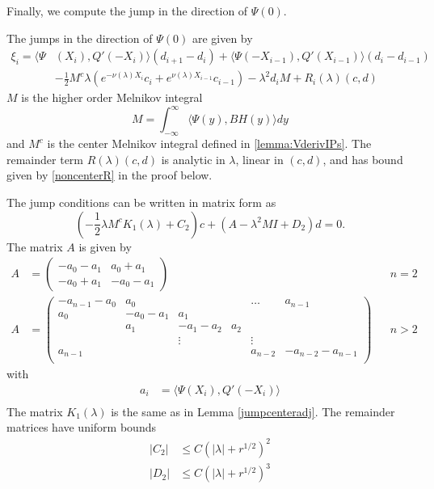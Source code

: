 \documentclass[thesis.tex]{subfiles}
\begin{document}
Finally, we compute the jump in the direction of $\Psi(0)$.

\begin{lemma}\label{jumpadj}
The jumps in the direction of $\Psi(0)$ are given by
\begin{equation}\label{jumpPsi0}
\begin{aligned}
\xi_i = \langle \Psi&(X_i), Q'(-X_i) \rangle (d_{i+1} - d_i ) + \langle \Psi(-X_{i-1}), Q'(X_{i-1}) \rangle (d_i - d_{i-1} ) \\
&- \frac{1}{2} M^c \lambda( e^{-\nu(\lambda)X_i}c_i + e^{\nu(\lambda)X_{i-1}}c_{i-1})
- \lambda^2 d_i M + R_i(\lambda)(c, d)
\end{aligned}
\end{equation}
$M$ is the higher order Melnikov integral
\begin{equation}\label{defM2}
M = \int_{-\infty}^\infty \langle \Psi(y), B H(y) \rangle dy
\end{equation}
and $M^c$ is the center Melnikov integral defined in \cref{lemma:VderivIPs}. The remainder term $R(\lambda)(c, d)$ is analytic in $\lambda$, linear in $(c, d)$, and has bound given by \cref{noncenterR} in the proof below. 

The jump conditions can be written in matrix form as
\begin{equation}
\left(-\frac{1}{2} \lambda M^c K_1(\lambda) + C_2 \right)c + (A - \lambda^2 M I + D_2)d = 0.
\end{equation}
The matrix $A$ is given by
\begin{align*}
A &= \begin{pmatrix}
-a_0 -a_1 & a_0 + a_1 \\
-a_0 + a_1 & -a_0 - a_1
\end{pmatrix} && n = 2 \\
A &= \begin{pmatrix}
-a_{n-1} - a_0 & a_0 & & & \dots & a_{n-1}\\
a_0 & -a_0 - a_1 &  a_1 \\
& a_1 & -a_1 - a_2 &  a_2 \\
& & \vdots & & \vdots \\
a_{n-1} & & & & a_{n-2} & -a_{n-2} - a_{n-1} \\
\end{pmatrix} && n > 2
\end{align*}
with
\begin{align*}
a_i &= \langle \Psi(X_i), Q'(-X_i) \rangle \\
\end{align*}
The matrix $K_1(\lambda)$ is the same as in Lemma \ref{jumpcenteradj}. The remainder matrices have uniform bounds
\begin{align}\label{adjjumprem}
|C_2| &\leq C (|\lambda| + r^{1/2})^2 \\
|D_2| &\leq C (|\lambda| + r^{1/2})^3 
\end{align}


\end{lemma}
\end{document}

